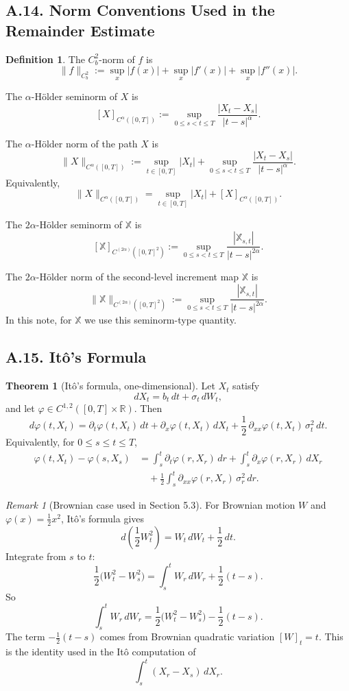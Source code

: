 \documentclass[11pt]{article}
\theoremstyle{definition}
\newtheorem{definition}{Definition}
\newtheorem{theorem}{Theorem}
\theoremstyle{remark}
\newtheorem{remark}{Remark}
\begin{document}
\subsection*{A.14. Norm Conventions Used in the Remainder Estimate}
\begin{definition}
The $C_b^2$-norm of $f$ is
\[
\|f\|_{C_b^2}
:=
\sup_x |f(x)|
+\sup_x |f'(x)|
+\sup_x |f''(x)|.
\]

The $\alpha$-H\"older seminorm of $X$ is
\[
[X]_{C^\alpha([0,T])}
:=
\sup_{0\le s<t\le T}\frac{|X_t-X_s|}{|t-s|^\alpha}.
\]

The $\alpha$-H\"older norm of the path $X$ is
\[
\|X\|_{C^\alpha([0,T])}
:=
\sup_{t\in[0,T]}|X_t|
+\sup_{0\le s<t\le T}\frac{|X_t-X_s|}{|t-s|^\alpha}.
\]
Equivalently,
\[
\|X\|_{C^\alpha([0,T])}
=
\sup_{t\in[0,T]}|X_t|+[X]_{C^\alpha([0,T])}.
\]

The $2\alpha$-H\"older seminorm of $\mathbb X$ is
\[
[\mathbb X]_{C^{(2\alpha)}([0,T]^2)}
:=
\sup_{0\le s<t\le T}\frac{|\mathbb X_{s,t}|}{|t-s|^{2\alpha}}.
\]

The $2\alpha$-H\"older norm of the second-level increment map $\mathbb X$ is
\[
\|\mathbb X\|_{C^{(2\alpha)}([0,T]^2)}
:=
\sup_{0\le s<t\le T}\frac{|\mathbb X_{s,t}|}{|t-s|^{2\alpha}}.
\]
In this note, for $\mathbb X$ we use this seminorm-type quantity.
\end{definition}

\subsection*{A.15. It\^o's Formula}
\begin{theorem}[It\^o's formula, one-dimensional]
Let $X_t$ satisfy
\[
dX_t=b_t\,dt+\sigma_t\,dW_t,
\]
and let $\varphi\in C^{1,2}([0,T]\times\mathbb R)$. Then
\[
d\varphi(t,X_t)
=
\partial_t\varphi(t,X_t)\,dt
+\partial_x\varphi(t,X_t)\,dX_t
+\frac12\,\partial_{xx}\varphi(t,X_t)\,\sigma_t^2\,dt.
\]
Equivalently, for $0\le s\le t\le T$,
\begin{align*}
\varphi(t,X_t)-\varphi(s,X_s)
&=
\int_s^t \partial_t\varphi(r,X_r)\,dr
+\int_s^t \partial_x\varphi(r,X_r)\,dX_r \\
&\quad
+\frac12\int_s^t \partial_{xx}\varphi(r,X_r)\,\sigma_r^2\,dr.
\end{align*}
\end{theorem}

\begin{remark}[Brownian case used in Section 5.3]
For Brownian motion $W$ and $\varphi(x)=\frac12 x^2$, It\^o's formula gives
\[
d\!\left(\frac12 W_t^2\right)=W_t\,dW_t+\frac12\,dt.
\]
Integrate from $s$ to $t$:
\[
\frac12\bigl(W_t^2-W_s^2\bigr)
=
\int_s^t W_r\,dW_r+\frac12(t-s).
\]
So
\[
\int_s^t W_r\,dW_r
=
\frac12\bigl(W_t^2-W_s^2\bigr)-\frac12(t-s).
\]
The term $-\frac12(t-s)$ comes from Brownian quadratic variation $[W]_t=t$.
This is the identity used in the It\^o computation of
\[
\int_s^t (X_r-X_s)\,dX_r.
\]
\end{remark}
\end{document}
